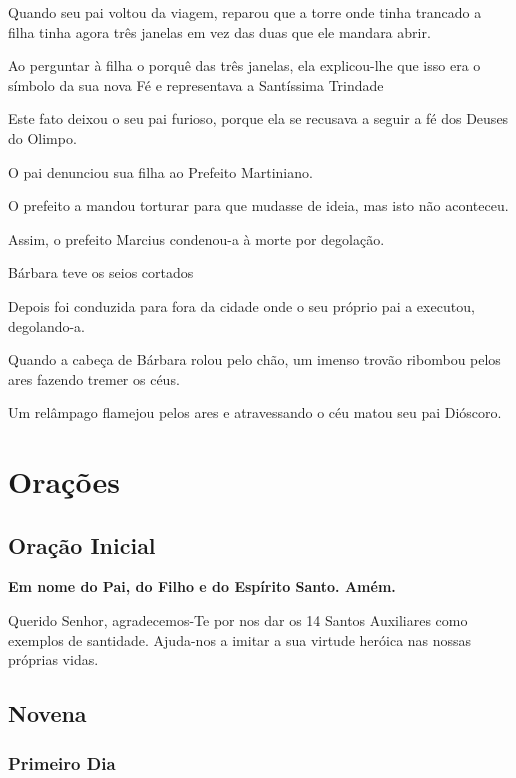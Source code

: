 \documentclass[a4paper,12pt]{extarticle} \usepackage[utf8]{inputenc}
\begin{document}
Quando seu pai voltou da viagem, reparou que a torre onde tinha trancado a filha tinha agora três janelas em vez das duas que ele mandara abrir.

Ao perguntar à filha o porquê das três janelas, ela explicou-lhe que isso era o símbolo da sua nova Fé e representava a Santíssima Trindade

Este fato deixou o seu pai furioso, porque ela se recusava a seguir a fé dos Deuses do Olimpo.

O pai denunciou sua filha ao Prefeito Martiniano.

O prefeito a mandou torturar para que mudasse de ideia, mas isto não aconteceu.

Assim, o prefeito Marcius condenou-a à morte por degolação.

Bárbara teve os seios cortados

Depois foi conduzida para fora da cidade onde o seu próprio pai a executou, degolando-a.

Quando a cabeça de Bárbara rolou pelo chão, um imenso trovão ribombou pelos ares fazendo tremer os céus.

Um relâmpago flamejou pelos ares e atravessando o céu matou seu pai Dióscoro.


\newpage
\section{Orações}

\subsection{Oração Inicial} \label{oracao-inicial}

\textbf{Em nome do Pai, do Filho e do Espírito Santo. Amém.}

Querido Senhor, agradecemos-Te por nos dar os 14 Santos Auxiliares como exemplos de santidade. Ajuda-nos a imitar a sua virtude heróica nas nossas próprias vidas.


\subsection{Novena}

\subsubsection{Primeiro Dia}

\noindent
\end{document}

